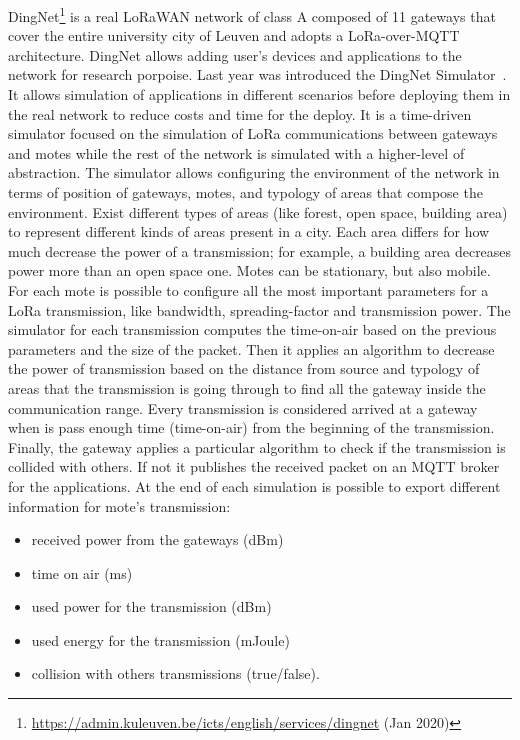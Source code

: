 DingNet\footnote{\href{https://admin.kuleuven.be/icts/english/services/dingnet}{https://admin.kuleuven.be/icts/english/services/dingnet} (Jan 2020)} is a real LoRaWAN network of class A composed of 11 gateways that cover the entire university city of Leuven and adopts a LoRa-over-MQTT architecture. 
% 
DingNet allows adding user's devices and applications to the network for research porpoise.
% 
Last year was introduced the DingNet Simulator~\cite{inproceedings}.
It allows simulation of applications in different scenarios before deploying them in the real network to reduce costs and time for the deploy.
% 
It is a time-driven simulator focused on the simulation of LoRa communications between gateways and motes while the rest of the network is simulated with a higher-level of abstraction. 
% 
The simulator allows configuring the environment of the network in terms of position of gateways, motes, and typology of areas that compose the environment. 
% 
Exist different types of areas (like forest, open space, building area) to represent different kinds of areas present in a city. 
Each area differs for how much decrease the power of a transmission; for example, a building area decreases power more than an open space one.
% 
Motes can be stationary, but also mobile.
% 
For each mote is possible to configure all the most important parameters for a LoRa transmission, like bandwidth, spreading-factor and transmission power. 
% 
The simulator for each transmission computes the time-on-air based on the previous parameters and the size of the packet. 
% 
Then it applies an algorithm to decrease the power of transmission based on the distance from source and typology of areas that the transmission is going through to find all the gateway inside the communication range.
% 
Every transmission is considered arrived at a gateway when is pass enough time (time-on-air) from the beginning of the transmission. 
Finally, the gateway applies a particular algorithm to check if the transmission is collided with others. If not it publishes the received packet on an MQTT broker for the applications.
%
At the end of each simulation is possible to export different information for mote's transmission:
\begin{itemize}
    \item received power from the gateways (dBm)
    \item time on air (ms)
    \item used power for the transmission (dBm)
    \item used energy for the transmission (mJoule)
    \item collision with others transmissions (true/false).
\end{itemize}

